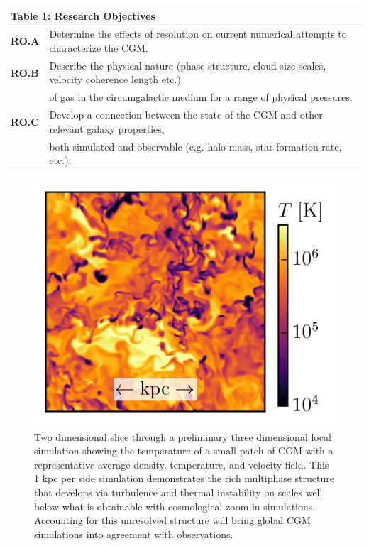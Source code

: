 \documentclass[11pt,letterpaper,english]{article}
\begin{document}
\begin{table}[h]
\vspace{-.12in}
\begin{tabular}{|l|l|} 
\multicolumn{2}{l}{\bf{Table 1: Research Objectives}}\\
\hline
\textbf{RO.A} & Determine the effects of resolution on current numerical attempts to characterize the CGM. \\ \hline
\textbf{RO.B} & Describe the physical nature (phase structure, cloud size scales, velocity coherence length etc.) \\
& of gas in the circumgalactic medium for a range of physical pressures. \\ \hline
\textbf{RO.C} & Develop a connection between the state of the CGM and other relevant galaxy properties, \\
& both simulated and observable (e.g. halo mass, star-formation rate, etc.). \\
\hline
\end{tabular}
\end{table}

\begin{figure}[h]
    \centering
    \begin{minipage}{0.33\textwidth}
\caption{Two dimensional slice through a preliminary three dimensional local simulation showing the temperature of a small patch of CGM with a representative average density, temperature, and velocity field. This 1 kpc per side simulation demonstrates the rich multiphase structure that develops via turbulence and thermal instability on scales well below what is obtainable with cosmological zoom-in simulations. Accounting for this unresolved structure will bring global CGM simulations \cite{Fielding17} into agreement with observations. \label{fig:CGMpatch}}
    \end{minipage}\hfill
    \begin{minipage}{0.67\textwidth}
        \hspace{0.3cm} 
        \includegraphics[width=1.04\textwidth]{T_proposal.png} 
    \end{minipage}
\end{figure}
\end{document}
